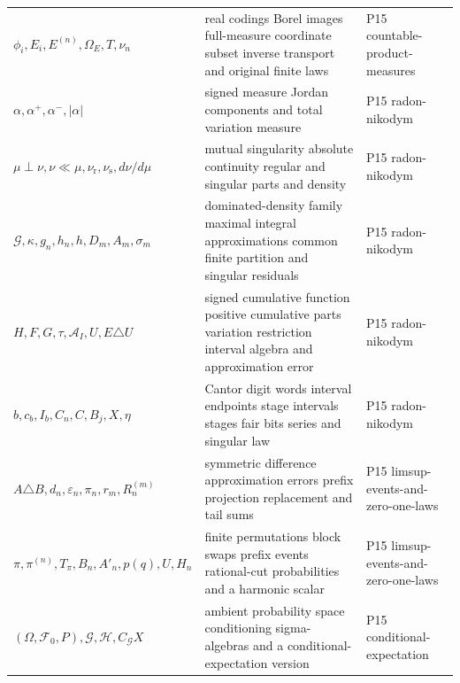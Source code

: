 \begin{longtable}{@{}p{}p{}p{}@{}}
\(\phi_i,\allowbreak E_i,\allowbreak E^{(n)},\allowbreak \Omega_E,\allowbreak T,\allowbreak \nu_n\) & real codings Borel images full-measure coordinate subset inverse transport and original finite laws & P15 countable-\allowbreak{}product-\allowbreak{}measures \\
\(\alpha,\allowbreak \alpha^+,\allowbreak \alpha^-,\allowbreak \lvert\alpha\rvert\) & signed measure Jordan components and total variation measure & P15 radon-\allowbreak{}nikodym \\
\(\mu\perp\nu,\allowbreak \nu\ll\mu,\allowbreak \nu_{\mathrm r},\allowbreak \nu_{\mathrm s},\allowbreak d\nu/d\mu\) & mutual singularity absolute continuity regular and singular parts and density & P15 radon-\allowbreak{}nikodym \\
\(\mathcal G,\allowbreak \kappa,\allowbreak g_n,\allowbreak h_n,\allowbreak h,\allowbreak D_m,\allowbreak A_m,\allowbreak \sigma_m\) & dominated-density family maximal integral approximations common finite partition and singular residuals & P15 radon-\allowbreak{}nikodym \\
\(H,\allowbreak F,\allowbreak G,\allowbreak \tau,\allowbreak \mathcal A_I,\allowbreak U,\allowbreak E\triangle U\) & signed cumulative function positive cumulative parts variation restriction interval algebra and approximation error & P15 radon-\allowbreak{}nikodym \\
\(b,\allowbreak c_b,\allowbreak I_b,\allowbreak C_n,\allowbreak C,\allowbreak B_j,\allowbreak X,\allowbreak \eta\) & Cantor digit words interval endpoints stage intervals stages fair bits series and singular law & P15 radon-\allowbreak{}nikodym \\
\(A\triangle B,\allowbreak d_n,\allowbreak \varepsilon_n,\allowbreak \pi_n,\allowbreak r_m,\allowbreak R_n^{(m)}\) & symmetric difference approximation errors prefix projection replacement and tail sums & P15 limsup-\allowbreak{}events-\allowbreak{}and-\allowbreak{}zero-\allowbreak{}one-\allowbreak{}laws \\
\(\pi,\allowbreak \pi^{(n)},\allowbreak T_\pi,\allowbreak B_n,\allowbreak A'_n,\allowbreak p(q),\allowbreak U,\allowbreak H_n\) & finite permutations block swaps prefix events rational-cut probabilities and a harmonic scalar & P15 limsup-\allowbreak{}events-\allowbreak{}and-\allowbreak{}zero-\allowbreak{}one-\allowbreak{}laws \\
\((\Omega,\allowbreak \mathcal F_0,\allowbreak P),\allowbreak \mathcal G,\allowbreak \mathcal H,\allowbreak C_{\mathcal G}X\) & ambient probability space conditioning sigma-algebras and a conditional-expectation version & P15 conditional-\allowbreak{}expectation \\

\end{longtable}
